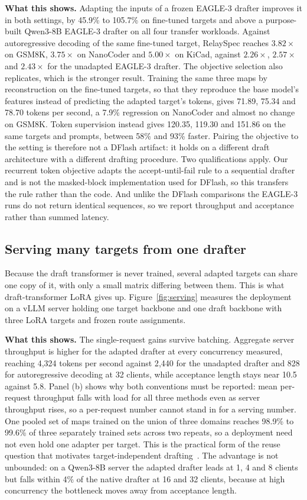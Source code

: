 \textbf{What this shows.} Adapting the inputs of a frozen EAGLE-3 drafter improves it in both settings, by 45.9\% to 105.7\% on fine-tuned targets and above a purpose-built Qwen3-8B EAGLE-3 drafter on all four transfer workloads. Against autoregressive decoding of the same fine-tuned target, RelaySpec reaches $3.82\times$ on GSM8K, $3.75\times$ on NanoCoder and $5.00\times$ on KiCad, against $2.26\times$, $2.57\times$ and $2.43\times$ for the unadapted EAGLE-3 drafter. The objective selection also replicates, which is the stronger result. Training the same three maps by reconstruction on the fine-tuned targets, so that they reproduce the base model's features instead of predicting the adapted target's tokens, gives 71.89, 75.34 and 78.70 tokens per second, a 7.9\% regression on NanoCoder and almost no change on GSM8K. Token supervision instead gives 120.35, 119.30 and 151.86 on the same targets and prompts, between 58\% and 93\% faster. Pairing the objective to the setting is therefore not a DFlash artifact: it holds on a different draft architecture with a different drafting procedure. Two qualifications apply. Our recurrent token objective adapts the accept-until-fail rule to a sequential drafter and is not the masked-block implementation used for DFlash, so this transfers the rule rather than the code. And unlike the DFlash comparisons the EAGLE-3 runs do not return identical sequences, so we report throughput and acceptance rather than summed latency.

\subsection{Serving many targets from one drafter}
\label{sec:serving}
Because the draft transformer is never trained, several adapted targets can share one copy of it, with only a small matrix differing between them. This is what draft-transformer LoRA gives up. Figure~\ref{fig:serving} measures the deployment on a vLLM server holding one target backbone and one draft backbone with three LoRA targets and frozen route assignments.



\textbf{What this shows.} The single-request gains survive batching. Aggregate server throughput is higher for the adapted drafter at every concurrency measured, reaching 4{,}324 tokens per second against 2{,}440 for the unadapted drafter and 828 for autoregressive decoding at 32 clients, while acceptance length stays near 10.5 against 5.8. Panel (b) shows why both conventions must be reported: mean per-request throughput falls with load for all three methods even as server throughput rises, so a per-request number cannot stand in for a serving number. One pooled set of maps trained on the union of three domains reaches 98.9\% to 99.6\% of three separately trained sets across two repeats, so a deployment need not even hold one adapter per target. This is the practical form of the reuse question that motivates target-independent drafting~\citep{an2026pard2}. The advantage is not unbounded: on a Qwen3-8B server the adapted drafter leads at 1, 4 and 8 clients but falls within 4\% of the native drafter at 16 and 32 clients, because at high concurrency the bottleneck moves away from acceptance length.

